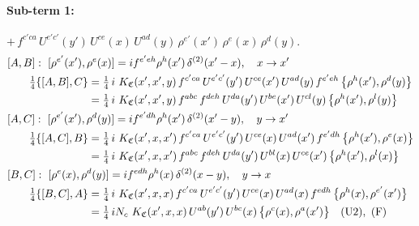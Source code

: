 \documentclass[10pt]{article}
\numberwithin{equation}{section}
\begin{document}
\paragraph{Sub-term 1:} $+\,f^{c'ca}\,U^{e'c'}(y')\,U^{ce}(x)\,U^{ad}(y)\,\rho^{e'}(x')\,\rho^{e}(x)\,\rho^{d}(y)$.
\begin{align}
&[A,B]:\ [\rho^{e'}(x'),\rho^{e}(x)]=i f^{e'eh}\rho^{h}(x')\,\delta^{(2)}(x'-x),\quad x\to x'\notag\\
&\qquad \tfrac14\{[A,B],C\}=\tfrac14\,i\,\,K_{\mathfrak C}(x',x',y)\,f^{c'ca}\,U^{e'c'}(y')\,U^{ce}(x')\,U^{ad}(y)\,f^{e'eh}\,\big\{\rho^{h}(x'),\rho^{d}(y)\big\}\notag\\
&\qquad\phantom{\tfrac14\{[A,B],C\}}=\tfrac14\,i\,\,K_{\mathfrak C}(x',x',y)\,f^{abc}\,f^{deh}\,U^{da}(y')\,U^{be}(x')\,U^{cl}(y)\,\big\{\rho^{h}(x'),\rho^{l}(y)\big\}
\label{R:eq:GIII.V-1-AB}\\
&[A,C]:\ [\rho^{e'}(x'),\rho^{d}(y)]=i f^{e'dh}\rho^{h}(x')\,\delta^{(2)}(x'-y),\quad y\to x'\notag\\
&\qquad \tfrac14\{[A,C],B\}=\tfrac14\,i\,\,K_{\mathfrak C}(x',x,x')\,f^{c'ca}\,U^{e'c'}(y')\,U^{ce}(x)\,U^{ad}(x')\,f^{e'dh}\,\big\{\rho^{h}(x'),\rho^{e}(x)\big\}\notag\\
&\qquad\phantom{\tfrac14\{[A,C],B\}}=\tfrac14\,i\,\,K_{\mathfrak C}(x',x,x')\,f^{abc}\,f^{deh}\,U^{da}(y')\,U^{bl}(x)\,U^{ce}(x')\,\big\{\rho^{h}(x'),\rho^{l}(x)\big\}
\label{R:eq:GIII.V-1-AC}\\
&[B,C]:\ [\rho^{e}(x),\rho^{d}(y)]=i f^{edh}\rho^{h}(x)\,\delta^{(2)}(x-y),\quad y\to x\notag\\
&\qquad \tfrac14\{[B,C],A\}=\tfrac14\,i\,\,K_{\mathfrak C}(x',x,x)\,f^{c'ca}\,U^{e'c'}(y')\,U^{ce}(x)\,U^{ad}(x)\,f^{edh}\,\big\{\rho^{h}(x),\rho^{e'}(x')\big\}\notag\\
&\qquad\phantom{\tfrac14\{[B,C],A\}}=\tfrac14\,i N_{c}\,\,K_{\mathfrak C}(x',x,x)\,U^{ab}(y')\,U^{bc}(x)\,\big\{\rho^{c}(x),\rho^{a}(x')\big\}\quad\text{(U2)},\ \text{(F)}
\label{R:eq:GIII.V-1-BC}
\end{align}
\end{document}
